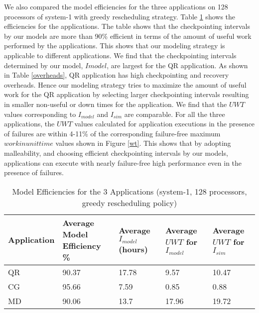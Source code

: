 \documentclass[conference,10pt]{IEEEtran}
\begin{document}
We also compared the model efficiencies for the three applications on
128 processors of system-1 with greedy rescheduling strategy. Table
\ref{app-results} shows the efficiencies for the applications. The table shows that the
checkpointing intervals by our models are more than 90\% efficient in
terms of the amount of useful work performed by the applications. This
shows that our modeling strategy is applicable to different
applications. We find that the checkpointing intervals determined by
our model, $Imodel$, are largest for the QR application. As shown in
Table \ref{overheads}, QR application has high checkpointing and
recovery overheads. Hence our modeling strategy tries to maximize the
amount of useful work for the QR application by selecting larger
checkpointing intervals resulting in smaller non-useful or down times
for the application. We find that the $UWT$ values corresponding to
$I_{model}$ and $I_{sim}$ are comparable. For all the three
applications, the $UWT$ values calculated for application executions in
the presence of failures are within 4-11\% of the corresponding
failure-free maximum $workinunittime$ values shown in Figure
\ref{wt}. This shows that by adopting malleability, and choosing
efficient checkpointing intervals by our models, applications can
execute with nearly failure-free high performance even in the presence
of failures.
\begin{table}
\centering
\caption{Model Efficiencies for the 3 Applications (system-1, 128
  processors, greedy rescheduling policy)}
\begin{tabular}{|p{0.6in}|p{0.5in}|p{0.4in}|p{0.4in}|p{0.4in}|}
\hline\hline
Application & Average Model Efficiency \% & Average $I_{model}$ (hours) &
Average $UWT$ for $I_{model}$ & Average $UWT$ for $I_{sim}$
\\ \hline\hline
QR & 90.37 & 17.78 & 9.57 & 10.47 \\ \hline
CG & 95.66 & 7.59 & 0.85 & 0.88 \\ \hline
MD & 90.06 & 13.7 & 17.96 & 19.72 \\ \hline\hline
\end{tabular}
\label{app-results}
\end{table}
\end{document}
